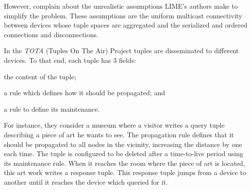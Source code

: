 \begin{sloppypar}
However, \citet{coulouris_distributed_2012} complain about the unrealistic assumptions LIME's authors make to simplify the problem. %
These assumptions are the uniform multicast connectivity between devices whose tuple spaces are aggregated and the serialized and ordered connections and disconnections.
\end{sloppypar}


In the \emph{TOTA} (Tuples On The Air) Project \citep{mamei_programming_2009} tuples are disseminated to different devices.
To that end, each tuple has 3 fields:
\begin{enumerate*}[label=\itshape(\arabic*\upshape)]
  \item the content of the tuple;
  \item a rule which defines how it should be propagated; and
  \item a rule to define its maintenance.
\end{enumerate*}

For instance, they consider a museum where a visitor writes a query tuple describing a piece of art he wants to see.
The propagation rule defines that it should be propagated to all nodes in the vicinity, increasing the distance by one each time.
The tuple is configured to be deleted after a time-to-live period using its maintenance rule.
When it reaches the room where the piece of art is located, this art work writes a response tuple.
This response tuple jumps from a device to another until it reaches the device which queried for it.






